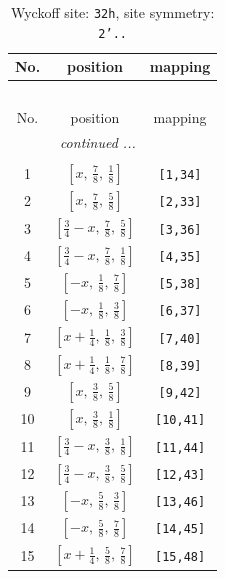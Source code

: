 \documentclass[fleqn,8pt]{jsarticle}
\begin{document}
\begin{longtable}{ccc}
\caption{Wyckoff site: {\tt 32h}, site symmetry: {\tt 2'..}}
 \\
 \hline \hline
No. & position & mapping \\ \hline \endfirsthead

\multicolumn{2}{l}{\tablename\ \thetable{}} \\
 \hline \hline
No. & position & mapping \\ \hline \endhead

 \hline \hline
\multicolumn{2}{r}{\footnotesize\it continued ...} \\ \endfoot

 \hline \hline
\multicolumn{2}{r}{} \\ \endlastfoot

1 & $\left[ x,\, \frac{7}{8},\, \frac{1}{8} \right]$ & {\tt [1,34]} \\ \hline
2 & $\left[ x,\, \frac{7}{8},\, \frac{5}{8} \right]$ & {\tt [2,33]} \\ \hline
3 & $\left[ \frac{3}{4} - x,\, \frac{7}{8},\, \frac{5}{8} \right]$ & {\tt [3,36]} \\ \hline
4 & $\left[ \frac{3}{4} - x,\, \frac{7}{8},\, \frac{1}{8} \right]$ & {\tt [4,35]} \\ \hline
5 & $\left[ - x,\, \frac{1}{8},\, \frac{7}{8} \right]$ & {\tt [5,38]} \\ \hline
6 & $\left[ - x,\, \frac{1}{8},\, \frac{3}{8} \right]$ & {\tt [6,37]} \\ \hline
7 & $\left[ x + \frac{1}{4},\, \frac{1}{8},\, \frac{3}{8} \right]$ & {\tt [7,40]} \\ \hline
8 & $\left[ x + \frac{1}{4},\, \frac{1}{8},\, \frac{7}{8} \right]$ & {\tt [8,39]} \\ \hline
9 & $\left[ x,\, \frac{3}{8},\, \frac{5}{8} \right]$ & {\tt [9,42]} \\ \hline
10 & $\left[ x,\, \frac{3}{8},\, \frac{1}{8} \right]$ & {\tt [10,41]} \\ \hline
11 & $\left[ \frac{3}{4} - x,\, \frac{3}{8},\, \frac{1}{8} \right]$ & {\tt [11,44]} \\ \hline
12 & $\left[ \frac{3}{4} - x,\, \frac{3}{8},\, \frac{5}{8} \right]$ & {\tt [12,43]} \\ \hline
13 & $\left[ - x,\, \frac{5}{8},\, \frac{3}{8} \right]$ & {\tt [13,46]} \\ \hline
14 & $\left[ - x,\, \frac{5}{8},\, \frac{7}{8} \right]$ & {\tt [14,45]} \\ \hline
15 & $\left[ x + \frac{1}{4},\, \frac{5}{8},\, \frac{7}{8} \right]$ & {\tt [15,48]} \\ \hline

\end{longtable}
\end{document}
